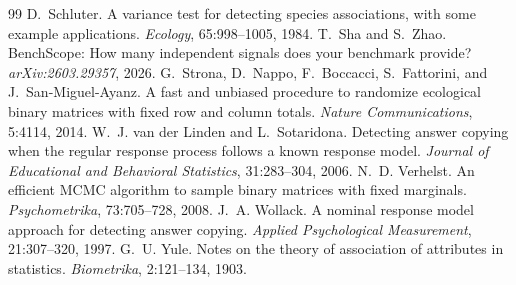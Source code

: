 \documentclass[pdflatex,sn-mathphys-ay]{sn-jnl}
\theoremstyle{thmstyleone}
\theoremstyle{thmstylethree}
\begin{document}
\begin{thebibliography}{99}
 D.~Schluter. A variance test for detecting species associations, with some example applications. \emph{Ecology}, 65:998--1005, 1984.
 T.~Sha and S.~Zhao. BenchScope: How many independent signals does your benchmark provide? \emph{arXiv:2603.29357}, 2026.
 G.~Strona, D.~Nappo, F.~Boccacci, S.~Fattorini, and J.~San-Miguel-Ayanz. A fast and unbiased procedure to randomize ecological binary matrices with fixed row and column totals. \emph{Nature Communications}, 5:4114, 2014.
 W.~J. van der Linden and L.~Sotaridona. Detecting answer copying when the regular response process follows a known response model. \emph{Journal of Educational and Behavioral Statistics}, 31:283--304, 2006.
 N.~D. Verhelst. An efficient MCMC algorithm to sample binary matrices with fixed marginals. \emph{Psychometrika}, 73:705--728, 2008.
 J.~A. Wollack. A nominal response model approach for detecting answer copying. \emph{Applied Psychological Measurement}, 21:307--320, 1997.
 G.~U. Yule. Notes on the theory of association of attributes in statistics. \emph{Biometrika}, 2:121--134, 1903.
\end{thebibliography}
\end{document}
